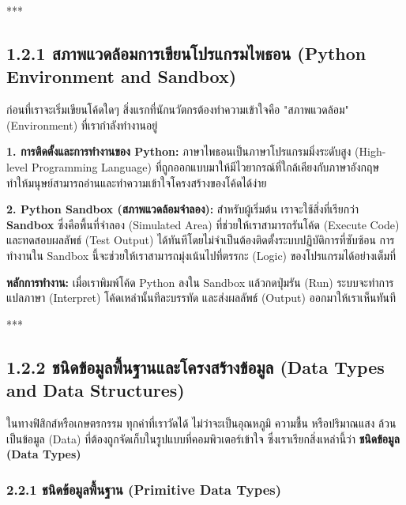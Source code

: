 \documentclass[11pt,a4paper,openany]{report}
\begin{document}
***

\subsection{1.2.1 สภาพแวดล้อมการเขียนโปรแกรมไพธอน (Python Environment and Sandbox)}


ก่อนที่เราจะเริ่มเขียนโค้ดใดๆ สิ่งแรกที่นักนวัตกรต้องทำความเข้าใจคือ "สภาพแวดล้อม" (Environment) ที่เรากำลังทำงานอยู่

\textbf{1. การติดตั้งและการทำงานของ Python:}
ภาษาไพธอนเป็นภาษาโปรแกรมมิ่งระดับสูง (High-level Programming Language) ที่ถูกออกแบบมาให้มีไวยากรณ์ที่ใกล้เคียงกับภาษาอังกฤษ ทำให้มนุษย์สามารถอ่านและทำความเข้าใจโครงสร้างของโค้ดได้ง่าย

\textbf{2. Python Sandbox (สภาพแวดล้อมจำลอง):}
สำหรับผู้เริ่มต้น เราจะใช้สิ่งที่เรียกว่า \textbf{Sandbox} ซึ่งคือพื้นที่จำลอง (Simulated Area) ที่ช่วยให้เราสามารถรันโค้ด (Execute Code) และทดสอบผลลัพธ์ (Test Output) ได้ทันทีโดยไม่จำเป็นต้องติดตั้งระบบปฏิบัติการที่ซับซ้อน การทำงานใน Sandbox นี้จะช่วยให้เราสามารถมุ่งเน้นไปที่ตรรกะ (Logic) ของโปรแกรมได้อย่างเต็มที่

\textbf{หลักการทำงาน:} เมื่อเราพิมพ์โค้ด Python ลงใน Sandbox แล้วกดปุ่มรัน (Run) ระบบจะทำการแปลภาษา (Interpret) โค้ดเหล่านั้นทีละบรรทัด และส่งผลลัพธ์ (Output) ออกมาให้เราเห็นทันที

***

\subsection{1.2.2 ชนิดข้อมูลพื้นฐานและโครงสร้างข้อมูล (Data Types and Data Structures)}


ในทางฟิสิกส์หรือเกษตรกรรม ทุกค่าที่เราวัดได้ ไม่ว่าจะเป็นอุณหภูมิ ความชื้น หรือปริมาณแสง ล้วนเป็นข้อมูล (Data) ที่ต้องถูกจัดเก็บในรูปแบบที่คอมพิวเตอร์เข้าใจ ซึ่งเราเรียกสิ่งเหล่านี้ว่า \textbf{ชนิดข้อมูล (Data Types)}

\subsubsection{2.2.1 ชนิดข้อมูลพื้นฐาน (Primitive Data Types)}
\end{document}
